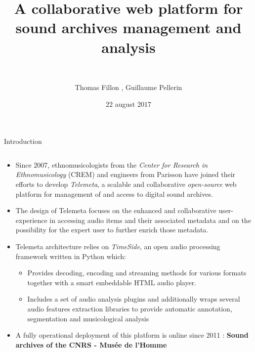 \documentclass[final, hyperref, table]{beamer}
\title[Telemeta \& TimeSide]{A collaborative web platform for sound archives management and analysis}
\subtitle{\ }
\author[Fillon, Pellerin]{Thomas Fillon \inst{1}, Guillaume Pellerin\inst{2}}
\institute[Parisson]{\small
  \inst{1}%
  Parisson, France
}
\institute[IRCAM]{\small
  \inst{2}%
  IRCAM, France
}
\date[22/08/2017]{22 august 2017}
\begin{document}
\begin{frame}[containsverbatim]{}
 \vspace{-0.1cm}
 \begin{block}{Introduction}\footnotesize
    \begin{columns}
      \begin{column}{0.7\linewidth}
        \begin{itemize}
        \item Since 2007, ethnomusicologists from the \emph{Center for Research in
            \alert{Ethnomusicology}} (CREM) and engineers from Parisson have joined
          their efforts to develop \emph{Telemeta}, a scalable and
          collaborative\alert{ \emph{open-source} web platform} for
          management of and access to \alert{digital sound archives}.
       
        \item The design of Telemeta focuses on the enhanced and
          \alert{collaborative} user-experience in accessing audio items and
          their associated \alert{metadata} and on the possibility
          for the expert user to further enrich those metadata.

        \item Telemeta architecture relies on \emph{TimeSide}, an open
    \alert{audio processing framework} written in Python which:
    \begin{itemize}\footnotesize
    \item Provides \alert{decoding, encoding and streaming}
      methods for various formats together with a smart
      embeddable \alert{HTML audio player}.
    \item Includes a set of audio analysis plugins and
      additionally wraps several \alert{audio features
        extraction} libraries to provide \alert{automatic
        annotation, segmentation and musicological analysis}
    \end{itemize}
  \item A fully operational deployment of this platform is online since
    2011 : \textbf{Sound archives of the CNRS - Musée de l'Homme}
  

\end{itemize}
\end{column}
\end{columns}
\end{block}
\end{frame}
\end{document}
